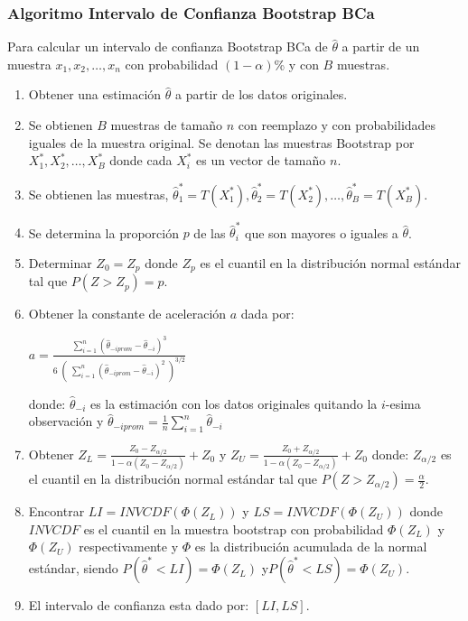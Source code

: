 \subsubsection{Algoritmo Intervalo de Confianza Bootstrap BCa}

Para calcular un intervalo de confianza Bootstrap BCa de $\hat{\theta}$ a partir de un muestra $x_{1}, x_{2}, \dots, x_{n}$ con probabilidad $(1-\alpha)$\% y con $B$ muestras.


\begin{enumerate}
 \item Obtener una estimación $\hat{\theta}$ a partir de los datos originales.
 
\item Se obtienen $B$ muestras de tamaño $n$ con reemplazo y con probabilidades iguales de la muestra original. Se denotan las muestras Bootstrap por $X^{*}_{1}, X^{*}_{2},  \dots, X^{*}_{B}$ donde cada $X^{*}_{i}$ es un vector de tamaño $n$.

\item Se obtienen las muestras, $\hat{\theta}^{*}_{1} = T (X^{*}_{1}) , \hat{\theta}^{*}_{2} = T (X^{*}_{2}), \dots,\hat{\theta}^{*}_{B} = T (X^{*}_{B})$.

\item Se determina la proporción $p$ de las  $\hat{\theta}^{*}_{i}$ que son mayores o iguales a $\hat{\theta}$.

\item  Determinar $Z_{0} = Z_{p}$ donde $Z_{p}$ es el cuantil en la distribución normal estándar tal que $P(Z > Z_{p}) = p$.

\item  Obtener la constante de aceleración $a$ dada por:
\begin{center}
 \Large $ a = \frac{\sum_{i=1}^{n}  (\hat{\theta}_{-iprom}  - \hat{\theta}_{-i})^{3} }{ 6 \; (\; \sum_{i=1}^{n}  ( \hat{\theta}_{-iprom}  - \hat{\theta}_{-i})^{2} \; )^{3/2}} $
\end{center}

 donde: $\hat{\theta}_{-i}$ es la estimación con los datos originales quitando la $i$-esima observación y {\normalsize $\hat{\theta}_{-iprom} = \frac{1}{n} \sum_{i=1}^{n}\hat{\theta}_{-i}$}
 
 \item Obtener {\large $Z_{L} = \frac{Z_{0} - Z_{\alpha/2}}{ 1- \alpha ( Z_{0} - Z_{\alpha/2})} + Z_{0}  $}   y {\large $Z_{U} = \frac{Z_{0} + Z_{\alpha/2}}{ 1- \alpha ( Z_{0} - Z_{\alpha/2})} + Z_{0}  $}  donde: $Z_{\alpha /2}$ es el cuantil en la
 distribución normal estándar tal que $P(Z > Z_{\alpha / 2}) = \frac{\alpha}{2}$.
 
 
 \item Encontrar $LI = INVCDF( \Phi(Z_{L}))$ y $LS = INVCDF( \Phi(Z_{U}))$ donde $INVCDF$ es el cuantil en la muestra bootstrap con probabilidad $ \Phi(Z_{L})$ y $ \Phi(Z_{U})$ respectivamente y $\Phi$ es la distribución acumulada de la normal estándar, siendo $P(\hat{\theta}^{*} < LI) = \Phi(Z_{L})$ y$P(\hat{\theta}^{*} < LS) = \Phi(Z_{U})$.
 
\item El intervalo de confianza esta dado por: $[LI, LS]$.
\end{enumerate}


